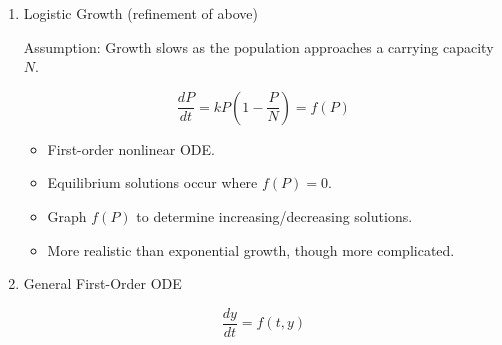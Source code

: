 \documentclass{article}
\begin{document}
\begin{enumerate}
\begin{enumerate}
\begin{itemize}
\item First-order linear ODE.
\item Unknown: the function $P(t)$.
\item General solution:
\[
P(t)=Ce^{kt}.
\]
\item An initial condition, e.g. $P(0)=P_0$, gives a unique (particular) solution.
\item The parameter $k$ represents the growth rate. This needs to be determined via empirical rule or data.
\item We will study:
    \begin{itemize}
    \item analytical solutions (formula for $P$),
    \item qualitative behavior (effects of different $P_0$, draw various cases, note equilibrium case),
    \item numerical approximations (if analytical solutions cannot be found, we will use Python for this).
    \end{itemize}
\item Discuss qualitative behavior for this one, equilibrium solutions, increasing and decreasing. Can reason out all possible solutions without formula.
\end{itemize}

\item Logistic Growth (refinement of above)

Assumption: Growth slows as the population approaches a carrying capacity $N$.

\[
\frac{dP}{dt}=kP\left(1-\frac{P}{N}\right)=f(P)
\]

\begin{itemize}
\item First-order nonlinear ODE.
\item Equilibrium solutions occur where $f(P)=0$.
\item Graph $f(P)$ to determine increasing/decreasing solutions.
\item More realistic than exponential growth, though more complicated.
\end{itemize}

\item General First-Order ODE

\[
\frac{dy}{dt}=f(t,y)
\]


\end{enumerate}
\end{enumerate}
\end{document}
